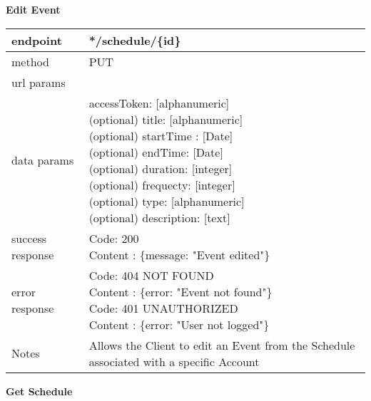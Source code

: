 \textbf{Edit Event}

\begin{tabularx}{\linewidth}{| l | l |}
	\hline
	endpoint & */schedule/\{id\} \\
	\hline
	method & PUT \\
	\hline
	url params & \\
	\hline
	data params & 
		\parbox{0.7\textwidth}{
		\bigskip
		accessToken: [alphanumeric] \\
		(optional) title: [alphanumeric]\\
		(optional) startTime : [Date]\\
		(optional) endTime: [Date] \\
		(optional) duration: [integer]\\
		(optional) frequecty: [integer]\\
		(optional) type: [alphanumeric]\\
		(optional) description: [text]
		\bigskip
	} \\
	\hline
	success response &
	\parbox{0.7\textwidth}{
		\bigskip
		Code: 200\\
		Content : \{message: "Event edited"\}
		\bigskip
	} \\
	\hline
	error response &
	\parbox{0.7\textwidth}{
		\bigskip
		Code: 404 NOT FOUND \\
		Content : \{error: "Event not found"\}\\
		Code: 401 UNAUTHORIZED \\
		Content : \{error: "User not logged"\}
		\bigskip
		\bigskip
	} \\
	\hline
	Notes & \parbox{0.7\textwidth}{
	\bigskip Allows the Client to edit an Event from the Schedule associated with a specific Account
	\bigskip} \\
	\hline
\end{tabularx}

\textbf{Get Schedule}

